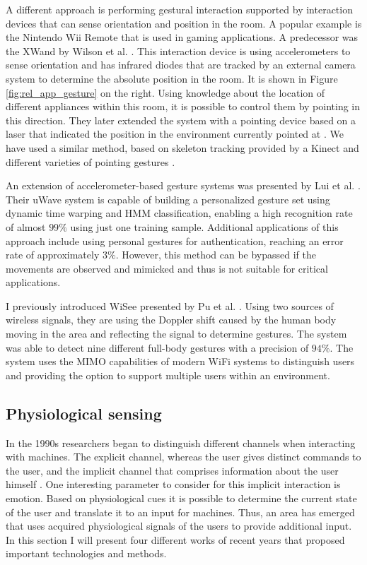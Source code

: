 A different approach is performing gestural interaction supported by interaction devices that can sense orientation and position in the room. A popular example is the Nintendo Wii Remote that is used in gaming applications. A predecessor was the XWand by Wilson et al. \cite{Wilson2003}. This interaction device is using accelerometers to sense orientation and has infrared diodes that are tracked by an external camera system to determine the absolute position in the room. It is shown in Figure \ref{fig:rel_app_gesture} on the right. Using knowledge about the location of different appliances within this room, it is possible to control them by pointing in this direction. They later extended the system with a pointing device based on a laser that indicated the position in the environment currently pointed at \cite{Wilson2003a}. We have used a similar method, based on skeleton tracking provided by a Kinect and different varieties of pointing gestures \cite{majewski2013providing}.

An extension of accelerometer-based gesture systems was presented by Lui et al. \cite{liu2009uwave}. Their uWave system is capable of building a personalized gesture set using dynamic time warping and HMM classification, enabling a high recognition rate of almost $99\%$ using just one training sample. Additional applications of this approach include using personal gestures for authentication, reaching an error rate of approximately $3\%$. However, this method can be bypassed if the movements are observed and mimicked and thus is not suitable for critical applications.

I previously introduced WiSee presented by Pu et al. \cite{pu2013whole}. Using two sources of wireless signals, they are using the Doppler shift caused by the human body moving in the area and reflecting the signal to determine gestures. The system was able to detect nine different full-body gestures with a precision of $94\%$. The system uses the MIMO capabilities of modern WiFi systems to distinguish users and providing the option to support multiple users within an environment.

\subsection{Physiological sensing}
In the 1990s researchers began to distinguish different channels when interacting with machines. The explicit channel, whereas the user gives distinct commands to the user, and the implicit channel that comprises information about the user himself \cite{cowie2001emotion}. One interesting parameter to consider for this implicit interaction is emotion. Based on physiological cues it is possible to determine the current state of the user and translate it to an input for machines. Thus, an area has emerged that uses acquired physiological signals of the users to provide additional input. In this section I will present four different works of recent years that proposed important technologies and methods.

